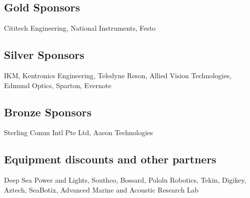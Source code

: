 \documentclass[journal,12pt]{IEEEtran}
\begin{document}
\subsection*{Gold Sponsors} 
Cititech Engineering, National Instruments, Festo

\subsection*{Silver Sponsors} 
IKM, Kentronics Engineering, Teledyne Reson, Allied Vision Technologies, Edmund Optics, Sparton, Evernote

\subsection*{Bronze Sponsors}
Sterling Comm Intl Pte Ltd, Aaeon Technologies 

\subsection*{Equipment discounts and other partners} 
Deep Sea Power and Lights, Southco, Bossard, Pololu Robotics, Tekin, Digikey, Aztech, SeaBotix, Advanced Marine and Acoustic Research Lab
\end{document}
